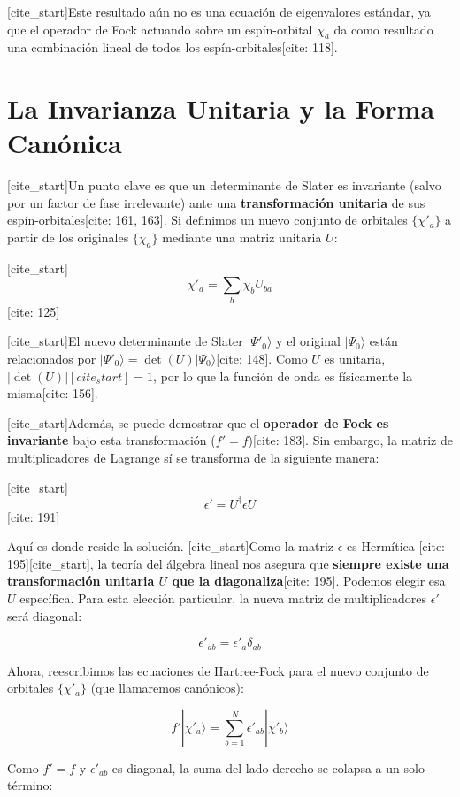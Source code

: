 \documentclass[12pt,a4paper]{article}
\begin{document}
[cite_start]Este resultado aún no es una ecuación de eigenvalores estándar, ya que el operador de Fock actuando sobre un espín-orbital $\chi_a$ da como resultado una combinación lineal de todos los espín-orbitales[cite: 118].

\section{La Invarianza Unitaria y la Forma Canónica}

[cite_start]Un punto clave es que un determinante de Slater es invariante (salvo por un factor de fase irrelevante) ante una \textbf{transformación unitaria} de sus espín-orbitales[cite: 161, 163]. Si definimos un nuevo conjunto de orbitales $\{\chi'_a\}$ a partir de los originales $\{\chi_a\}$ mediante una matriz unitaria $U$:

[cite_start]$$ \chi'_a = \sum_{b} \chi_b U_{ba} $$ [cite: 125]

[cite_start]El nuevo determinante de Slater $|\Psi'_0\rangle$ y el original $|\Psi_0\rangle$ están relacionados por $|\Psi'_0\rangle = \det(U)|\Psi_0\rangle$[cite: 148]. Como $U$ es unitaria, $|\det(U)| [cite_start]= 1$, por lo que la función de onda es físicamente la misma[cite: 156].

[cite_start]Además, se puede demostrar que el \textbf{operador de Fock es invariante} bajo esta transformación ($f' = f$)[cite: 183]. Sin embargo, la matriz de multiplicadores de Lagrange sí se transforma de la siguiente manera:

[cite_start]$$ \epsilon' = U^\dagger \epsilon U $$ [cite: 191]

Aquí es donde reside la solución. [cite_start]Como la matriz $\epsilon$ es Hermítica [cite: 195][cite_start], la teoría del álgebra lineal nos asegura que \textbf{siempre existe una transformación unitaria $U$ que la diagonaliza}[cite: 195]. Podemos elegir esa $U$ específica. Para esta elección particular, la nueva matriz de multiplicadores $\epsilon'$ será diagonal:

$$ \epsilon'_{ab} = \epsilon'_a \delta_{ab} $$

Ahora, reescribimos las ecuaciones de Hartree-Fock para el nuevo conjunto de orbitales $\{\chi'_a\}$ (que llamaremos canónicos):

$$ f'|\chi'_a\rangle = \sum_{b=1}^{N}\epsilon'_{ab}|\chi'_b\rangle $$

Como $f' = f$ y $\epsilon'_{ab}$ es diagonal, la suma del lado derecho se colapsa a un solo término:
\end{document}
